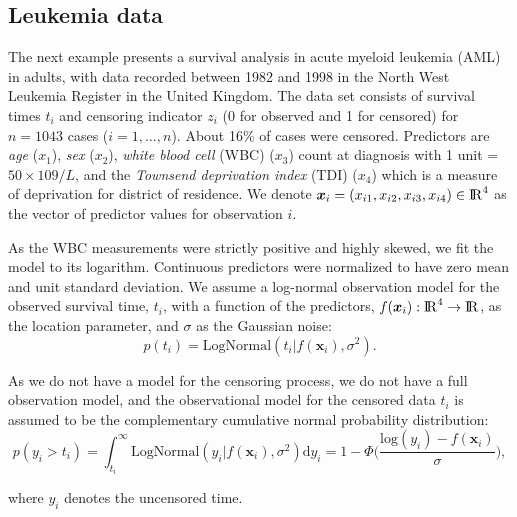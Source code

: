 \documentclass[onecolumn,a4paper,11pt]{article}
\begin{document}
\subsection{Leukemia data}\label{ch5_sec_bf_caseVI}
The next example presents a survival analysis in acute myeloid leukemia (AML) in adults, with data recorded between 1982 and 1998 in the North West Leukemia Register in the United Kingdom. The data set consists of survival times $t_i$ and censoring indicator $z_i$ (0 for observed and 1 for censored) for $n=1043$ cases ($i=1,\dots,n$). About 16\% of cases were censored. Predictors are \textit{age} ($x_1$), \textit{sex} ($x_2$), \textit{white blood cell} (WBC) ($x_3$) count at diagnosis with 1 unit = $50\times109/L$, and the \textit{Townsend deprivation index} (TDI) ($x_4$) which is a measure of deprivation for district of residence. We denote $\bm{x}_i=(x_{i1},x_{i2},x_{i3},x_{i4}) \in {\rm I\!R}^{4}$ as the vector of predictor values for observation $i$.


As the WBC measurements were strictly positive and highly skewed, we fit the model to its logarithm. Continuous predictors were normalized to have zero mean and unit standard deviation. %
We assume a log-normal observation model for the observed survival time, $t_i$, with a function of the predictors, $f(\bm{x}_i):{\rm I\!R}^4 \to {\rm I\!R}$, as the location parameter, and $\sigma$ as the Gaussian noise: 
%
\begin{equation*}
p(t_i)= \mathrm{LogNormal}(t_i|f(\bm{x}_i),\sigma^2).
\end{equation*}

As we do not have a model for the censoring process, we do not have a full observation model, and the observational model for the censored data $t_i$ is assumed to be the complementary cumulative normal probability distribution:
%
\begin{equation*}
p(y_i > t_i)= \int_{t_i}^{\infty} \mathrm{LogNormal}(y_i|f(\bm{x}_i),\sigma^2) \mathrm{d}y_i=  1 - \Phi\! \Big( \frac{\mathrm{log}(y_i)-f(\bm{x}_i)}{\sigma} \Big),
\end{equation*}

\noindent where $y_i$ denotes the uncensored time.
\end{document}
